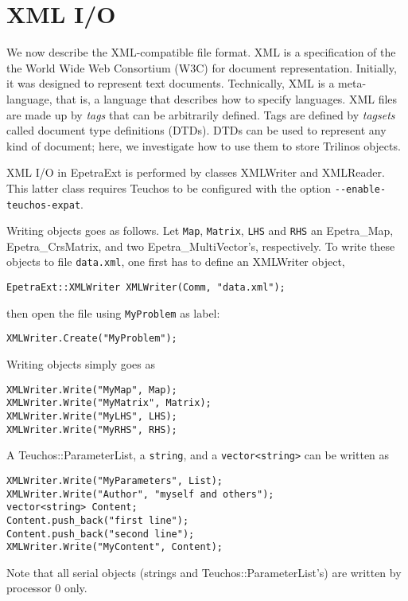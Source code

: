 \documentclass[11pt,relax]{SANDreport}
\begin{document}
\section{XML I/O}
\label{sec:xml}

We now describe the XML-compatible file format. XML is a specification of the
the World Wide Web Consortium (W3C) for document representation. Initially, it
was designed to represent text documents. Technically, XML is a meta-language,
that is, a language that describes how to specify languages. 
XML files are made up by {\sl tags} that can be arbitrarily defined. Tags are
defined by {\sl tagsets} called document type definitions (DTDs). DTDs can be used
to represent any kind of document; here, we investigate how to use them to
store Trilinos objects.

XML I/O in EpetraExt is performed by classes XMLWriter and XMLReader. This
latter class requires Teuchos to be configured with the option 
\verb!--enable-teuchos-expat!.

\smallskip

Writing objects goes as follows. Let \verb!Map!, \verb!Matrix!, \verb!LHS! and
\verb!RHS! an 
Epetra\_Map, Epetra\_CrsMatrix, and two Epetra\_MultiVector's, respectively.
To write these objects to file \verb!data.xml!, one first has to define an
XMLWriter object,
\begin{verbatim}
EpetraExt::XMLWriter XMLWriter(Comm, "data.xml");
\end{verbatim}
then open the file using \verb!MyProblem! as label:
\begin{verbatim}
XMLWriter.Create("MyProblem");
\end{verbatim}
Writing objects simply goes as
\begin{verbatim}
XMLWriter.Write("MyMap", Map);
XMLWriter.Write("MyMatrix", Matrix);
XMLWriter.Write("MyLHS", LHS);
XMLWriter.Write("MyRHS", RHS);
\end{verbatim}
A Teuchos::ParameterList, a \verb!string!, and a \verb!vector<string>! can be written as
\begin{verbatim}
XMLWriter.Write("MyParameters", List);
XMLWriter.Write("Author", "myself and others");
vector<string> Content;
Content.push_back("first line");
Content.push_back("second line");
XMLWriter.Write("MyContent", Content);
\end{verbatim}
Note that all serial objects (strings and Teuchos::ParameterList's) are
written by processor 0 only.
\end{document}
